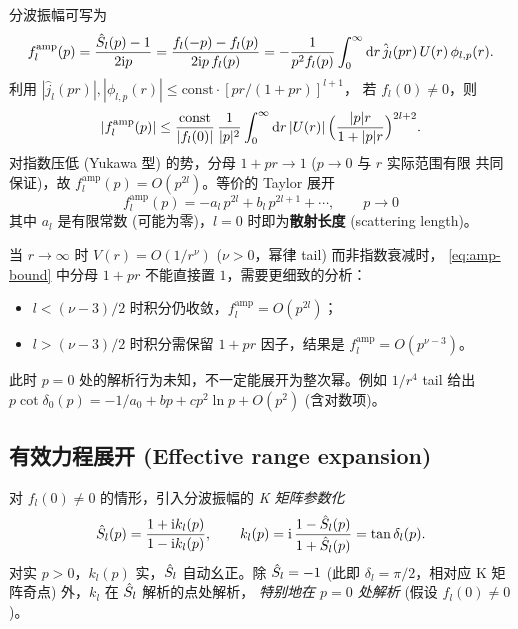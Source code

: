分波振幅可写为
\begin{equation}
f_l^{\text{amp}}(p)=\frac{\hat{S}_l(p)-1}{2\mathrm{i} p}
=\frac{f_l(-p)-f_l(p)}{2\mathrm{i} p\,f_l(p)}
=-\frac{1}{p^2 f_l(p)}\int_0^\infty\mathrm{d} r\,\hat j_l(pr)\,U(r)\,\phi_{l,p}(r).
\label{eq:amp-int}
\end{equation}
利用 $|\hat j_l(pr)|,|\phi_{l,p}(r)|\leq \mathrm{const}\cdot[pr/(1+pr)]^{l+1}$，
若 $f_l(0)\neq 0$，则
\begin{equation}
|f_l^{\text{amp}}(p)|\leq \frac{\mathrm{const}}{|f_l(0)|}\,\frac{1}{|p|^2}
\int_0^\infty \mathrm{d} r\,|U(r)|\,\Bigl(\frac{|p|r}{1+|p|r}\Bigr)^{2l+2}.
\label{eq:amp-bound}
\end{equation}
对指数压低 (Yukawa 型) 的势，分母 $1+pr\to 1$ ($p\to 0$ 与 $r$ 实际范围有限
共同保证)，故 $f_l^{\text{amp}}(p)=O(p^{2l})$。等价的 Taylor 展开
\begin{equation}
\boxed{\;f_l^{\text{amp}}(p)=-a_l\,p^{2l}+b_l\,p^{2l+1}+\cdots,\qquad p\to 0\;}
\label{eq:scattering-length}
\end{equation}
其中 $a_l$ 是有限常数 (可能为零)，$l=0$ 时即为\textbf{散射长度} (scattering length)。

\begin{remark}[长程势的破坏]
当 $r\to\infty$ 时 $V(r)=O(1/r^\nu)$ ($\nu>0$，幂律 tail) 而非指数衰减时，
\eqref{eq:amp-bound} 中分母 $1+pr$ 不能直接置 $1$，需要更细致的分析：
\begin{itemize}
\item $l<(\nu-3)/2$ 时积分仍收敛，$f_l^{\text{amp}}=O(p^{2l})$；
\item $l>(\nu-3)/2$ 时积分需保留 $1+pr$ 因子，结果是 $f_l^{\text{amp}}=O(p^{\nu-3})$。
\end{itemize}
此时 $p=0$ 处的解析行为未知，不一定能展开为整次幂。例如 $1/r^4$ tail 给出
$p\cot\delta_0(p)=-1/a_0+bp+cp^2\ln p+O(p^2)$ (含对数项)。
\end{remark}

\subsection{有效力程展开 (Effective range expansion)}\label{ssec:effective-range}

对 $f_l(0)\neq 0$ 的情形，引入分波振幅的 \emph{K 矩阵参数化}
\begin{equation}
\hat{S}_l(p)=\frac{1+\mathrm{i} k_l(p)}{1-\mathrm{i} k_l(p)},\qquad
k_l(p)=\mathrm{i}\,\frac{1-\hat{S}_l(p)}{1+\hat{S}_l(p)}=\tan\delta_l(p).
\label{eq:K-matrix}
\end{equation}
对实 $p>0$，$k_l(p)$ 实，$\hat{S}_l$ 自动幺正。除 $\hat{S}_l=-1$ (此即
$\delta_l=\pi/2$，相对应 K 矩阵奇点) 外，$k_l$ 在 $\hat{S}_l$ 解析的点处解析，
\emph{特别地在 $p=0$ 处解析} (假设 $f_l(0)\neq 0$)。

